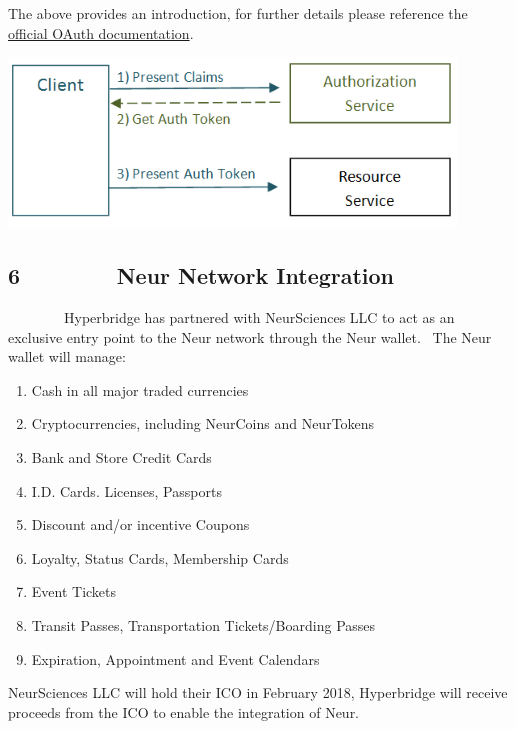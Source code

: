 \documentclass[]{article}
\providecommand{\tightlist}{%
  \setlength{\itemsep}{0pt}\setlength{\parskip}{0pt}}
\begin{document}
{The above provides an introduction, for further details please
reference the
}{\href{https://www.google.com/url?q=https://oauth.net/2/\&sa=D\&ust=1512628005821000\&usg=AFQjCNHaMop_YGsfsnSgtuc2shfO_lXtoQ}{official
OAuth documentation}}{.}

{}

{\includegraphics{images/image1.png}}

{}

{}

\hypertarget{h.1otrvur1822q}{%
\subsection{\texorpdfstring{{6~~~~~~~~Neur Network
Integration}}{6~~~~~~~~Neur Network Integration}}\label{h.1otrvur1822q}}

{~~~~~~~~Hyperbridge has partnered with NeurSciences LLC to act as an
exclusive entry point to the Neur network through the Neur wallet. ~The
Neur wallet will manage:}

{}

\begin{enumerate}
\tightlist
\item
  {Cash in all major traded currencies}
\item
  {Cryptocurrencies, including NeurCoins and NeurTokens}
\item
  {Bank and Store Credit Cards }
\item
  {I.D. Cards. Licenses, Passports ~}
\item
  {Discount and/or incentive Coupons}
\item
  {Loyalty, Status Cards, Membership Cards }
\item
  {Event Tickets }
\item
  {Transit Passes, Transportation Tickets/Boarding Passes }
\item
  {Expiration, Appointment and Event Calendars}
\end{enumerate}

{NeurSciences LLC will hold their ICO in February 2018, Hyperbridge will
receive proceeds from the ICO to enable the integration of Neur. }
\end{document}
